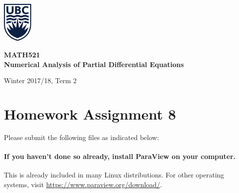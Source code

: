 

\usepackage{amsfonts,amsmath,amssymb,braket,xcolor,enumerate,graphicx}
\usepackage[hidelinks]{hyperref}
\usepackage{listings,multicol,mathtools,textcomp,tikz,pgfplots,wrapfig}
\usepackage{tabularx}
\usepackage{booktabs}
\usetikzlibrary{arrows}

\pagestyle{empty}
\setlength{\parindent}{0pt}
\setlength{\parskip}{6pt}




\begin{minipage}{.2\textwidth}
\includegraphics[width=42pt]{ubc-logo.png}
\end{minipage}
\hfill
\begin{minipage}{.75\textwidth}
\setlength{\parskip}{6pt}
\begin{flushright}
{\sffamily
\textbf{MATH521}\\
\textbf{Numerical Analysis of Partial Differential Equations}

Winter 2017/18, Term 2%
}
\end{flushright}
\end{minipage}

\section*{Homework Assignment 8}

Please submit the following files as indicated below:%

\paragraph*{If you haven't done so already, install \textsf{ParaView} on your computer.}

This is already included in many \textsf{Linux} distributions. For other operating systems, visit \url{https://www.paraview.org/download/}.

